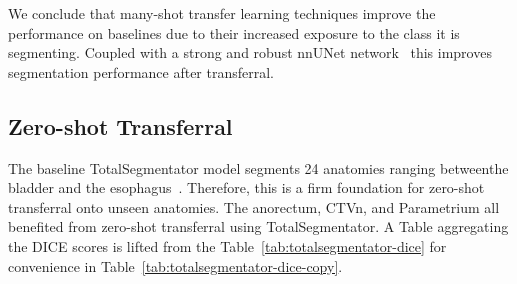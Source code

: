 \documentclass[11pt,twoside]{report}
\begin{document}
We conclude that many-shot transfer learning techniques improve the performance on baselines due to their increased exposure to the class it is segmenting. Coupled with a strong and robust nnUNet network~\cite{isensee2024nnunet, nnunet} this improves segmentation performance after transferral.

\subsection{Zero-shot Transferral}\label{sec:totseg-zero-shot-transfer}

The baseline TotalSegmentator model segments 24 anatomies ranging betweenthe bladder and the esophagus~\cite{totalsegmentor-git}. Therefore, this is a firm foundation for zero-shot transferral onto unseen anatomies. The anorectum, CTVn, and Parametrium all benefited from zero-shot transferral using TotalSegmentator. A Table aggregating the DICE scores is lifted from the Table~\ref{tab:totalsegmentator-dice} for convenience in Table~\ref{tab:totalsegmentator-dice-copy}.

\begin{table}[h!]
  \centering
  \caption{DICE scores across each anatomy. Bold values highlight the best model for the anaotmy.}
  \label{tab:totalsegmentator-dice-copy}
\end{table}
\end{document}
